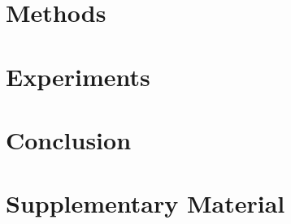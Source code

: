 \documentclass[a4paper]{template/hkustgz-thesis}
\begin{document}
\chapter{Methods}
\label{chap:methods}


\chapter{Experiments}
\label{chap:experiments}


\chapter{Conclusion}
\label{chap:conclusion}


\printthebibliography

\appendix
\chapter{Supplementary Material}

\end{document}
